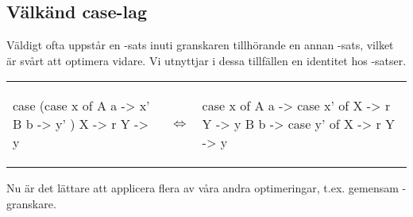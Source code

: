 \documentclass[../Optimise]{subfiles}
\begin{document}
\subsection{Välkänd case-lag}

Väldigt ofta uppstår en -sats inuti granskaren tillhörande en annan -sats, 
vilket är svårt att optimera vidare.
Vi utnyttjar i dessa tillfällen en identitet hos -satser. \cite{santos}



\begin{tabular}{ m{5cm} m{0.5cm} m{5cm} }
\begin{codeEx}
 case (case x of
         A a -> x'
         B b -> y'
      )
   X -> r
   Y -> y
\end{codeEx}
	& $\Leftrightarrow$
	&
\begin{codeEx}
 case x of
     A a -> case x' of
              X -> r
              Y -> y
     B b -> case y' of
              X -> r
              Y -> y
\end{codeEx}
\\
\end{tabular}

Nu är det lättare att applicera flera av våra andra optimeringar, 
t.ex. gemensam -granskare. 
\end{document}
